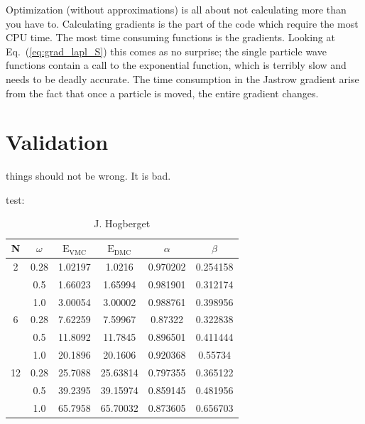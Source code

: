 Optimization (without approximations) is all about not calculating more than you have to. Calculating gradients is the part of the code which require the most CPU time. The most time consuming functions is the gradients. Looking at Eq.~(\ref{eq:grad_lapl_S}) this comes as no surprise; the single particle wave functions contain a call to the exponential function, which is terribly slow and needs to be deadly accurate. The time consumption in the Jastrow gradient arise from the fact that once a particle is moved, the entire gradient changes. 

\section{Validation}

things should not be wrong. It is bad.


test:
\newpage
\begin{table}
\begin{center}
\label{tab:DMCRes}
\begin{tabular}{cc|cccc}
    N     & $\omega$ & $\mathrm{E_{VMC}}$ & $\mathrm{E_{DMC}}$ & $\alpha$ & $\beta$  \\
\hline
    2     &   0.28   & 1.02197  &  1.0216  & 0.970202 & 0.254158 \\
          &   0.5    & 1.66023  & 1.65994  & 0.981901 & 0.312174 \\
          &   1.0    & 3.00054  & 3.00002  & 0.988761 & 0.398956 \\
    6     &   0.28   & 7.62259  & 7.59967  & 0.87322  & 0.322838 \\
          &   0.5    & 11.8092  & 11.7845  & 0.896501 & 0.411444 \\
          &   1.0    & 20.1896  & 20.1606  & 0.920368 & 0.55734  \\
    12    &   0.28   & 25.7088  & 25.63814 & 0.797355 & 0.365122 \\
          &   0.5    & 39.2395  & 39.15974 & 0.859145 & 0.481956 \\
          &   1.0    & 65.7958  & 65.70032 & 0.873605 & 0.656703 \\
\end{tabular}
\caption{J. Hogberget}
\end{center}
\end{table}

